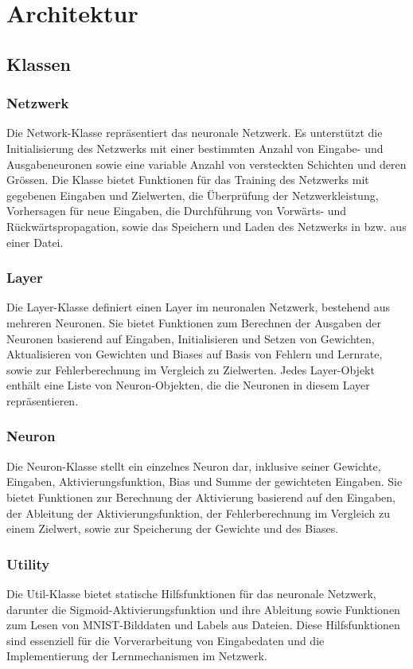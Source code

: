\section{Architektur}
\label{sec:RealArchitektur}
\subsection{Klassen}
\label{sec:RealKlassen}
\subsubsection{Netzwerk}
\label{sec:RealNetzwerk}
Die Network-Klasse repräsentiert das neuronale Netzwerk. Es unterstützt die Initialisierung des Netzwerks mit einer bestimmten Anzahl von Eingabe- und Ausgabeneuronen sowie eine variable Anzahl von versteckten Schichten und deren Grössen. Die Klasse bietet Funktionen für das Training des Netzwerks mit gegebenen Eingaben und Zielwerten, die Überprüfung der Netzwerkleistung, Vorhersagen für neue Eingaben, die Durchführung von Vorwärts- und Rückwärtspropagation, sowie das Speichern und Laden des Netzwerks in bzw. aus einer Datei. 
\subsubsection{Layer}
\label{sec:RealLayer}
Die Layer-Klasse definiert einen Layer im neuronalen Netzwerk, bestehend aus mehreren Neuronen. Sie bietet Funktionen zum Berechnen der Ausgaben der Neuronen basierend auf Eingaben, Initialisieren und Setzen von Gewichten, Aktualisieren von Gewichten und Biases auf Basis von Fehlern und Lernrate, sowie zur Fehlerberechnung im Vergleich zu Zielwerten. Jedes Layer-Objekt enthält eine Liste von Neuron-Objekten, die die Neuronen in diesem Layer repräsentieren. 
\subsubsection{Neuron}
\label{sec:RealNeuron}
Die Neuron-Klasse stellt ein einzelnes Neuron dar, inklusive seiner Gewichte, Eingaben, Aktivierungsfunktion, Bias und Summe der gewichteten Eingaben. Sie bietet Funktionen zur Berechnung der Aktivierung basierend auf den Eingaben, der Ableitung der Aktivierungsfunktion, der Fehlerberechnung im Vergleich zu einem Zielwert, sowie zur Speicherung der Gewichte und des Biases. 
\subsubsection{Utility}
\label{sec:RealUtility}
Die Util-Klasse bietet statische Hilfsfunktionen für das neuronale Netzwerk, darunter die Sigmoid-Aktivierungsfunktion und ihre Ableitung sowie Funktionen zum Lesen von MNIST-Bilddaten und Labels aus Dateien. Diese Hilfsfunktionen sind essenziell für die Vorverarbeitung von Eingabedaten und die Implementierung der Lernmechanismen im Netzwerk. 
